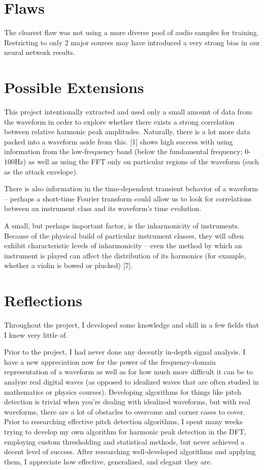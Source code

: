 \documentclass[12pt]{article}
\begin{document}
\section{Flaws}
The clearest flaw was not using a more diverse pool of audio samples for training. Restricting to only 2 major sources may have introduced a very strong bias in our neural network results.

\section{Possible Extensions}
This project intentionally extracted and used only a small amount of data from the waveform in order to explore whether there exists a strong correlation between relative harmonic peak amplitudes. Naturally, there is a lot more data packed into a waveform aside from this. [1] shows high success with using information from the low-frequency band (below the fundamental frequency; $0$-$100$Hz) as well as using the FFT only on particular regions of the waveform (such as the attack envelope).

There is also information in the time-dependent transient behavior of a waveform -- perhaps a short-time Fourier transform could allow us to look for correlations between an instrument class and its waveform's time evolution.

A small, but perhaps important factor, is the inharmonicity of instruments. Because of the physical build of particular instrument classes, they will often exhibit characteristic levels of inharmonicity -- even the method by which an instrument is played can affect the distribution of its harmonics (for example, whether a violin is bowed or plucked) [7].

\section{Reflections}
Throughout the project, I developed some knowledge and skill in a few fields that I knew very little of.

Prior to the project, I had never done any decently in-depth signal analysis. I have a new appreciation now for the power of the frequency-domain representation of a waveform as well as for how much more difficult it can be to analyze real digital waves (as opposed to idealized waves that are often studied in mathematics or physics courses). Developing algorithms for things like pitch detection is trivial when you're dealing with idealized waveforms, but with real waveforms, there are a lot of obstacles to overcome and corner cases to cover. Prior to researching effective pitch detection algorithms, I spent many weeks trying to develop my own algorithm for harmonic peak detection in the DFT, employing custom thresholding and statistical methods, but never achieved a decent level of success. After researching well-developed algorithms and applying them, I appreciate how effective, generalized, and elegant they are.
\end{document}
